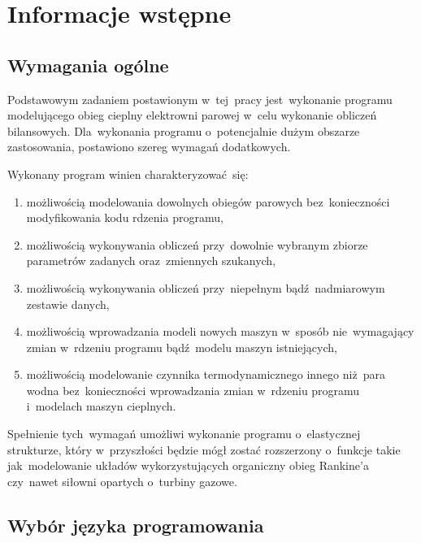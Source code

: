 \section{Informacje wstępne}

\subsection{Wymagania ogólne}

Podstawowym zadaniem postawionym w~tej~pracy jest~wykonanie programu
modelującego obieg cieplny elektrowni parowej w~celu wykonanie obliczeń
bilansowych. Dla~wykonania programu o~potencjalnie dużym obszarze
zastosowania, postawiono szereg wymagań dodatkowych.

Wykonany program winien charakteryzować~się:

\begin{enumerate}

	\item możliwością modelowania dowolnych obiegów parowych
	bez~konieczności modyfikowania kodu rdzenia programu,

	\item możliwością wykonywania obliczeń przy~dowolnie wybranym
	zbiorze parametrów zadanych oraz~zmiennych szukanych,

	\item możliwością wykonywania obliczeń przy~niepełnym
	bądź~nadmiarowym zestawie danych,

	\item możliwością wprowadzania modeli nowych maszyn w~sposób
	nie~wymagający zmian w~rdzeniu programu bądź~modelu maszyn
	istniejących,

	\item możliwością modelowanie czynnika termodynamicznego innego
	niż~para wodna bez~konieczności wprowadzania zmian w~rdzeniu
	programu i~modelach maszyn cieplnych.

\end{enumerate}

Spełnienie tych~wymagań umożliwi wykonanie programu o~elastycznej
strukturze, który w~przyszłości będzie mógł zostać rozszerzony o~funkcje
takie jak~modelowanie układów wykorzystujących organiczny obieg
Rankine'a czy~nawet siłowni opartych o~turbiny gazowe.


\subsection{Wybór języka programowania}

